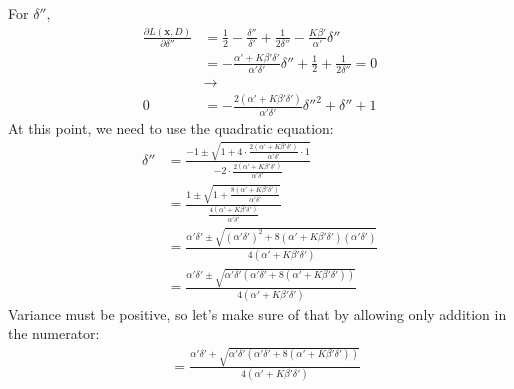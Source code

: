 \documentclass[12pt]{article}
\begin{document}
\begin{appendices}
For $\delta''$,
\begin{align}
    \frac{\partial L(\bm{x}, D)}{\partial \delta''} &=
    \frac{1}{2} - \frac{\delta''}{\delta'}
    + \frac{1}{2\delta''} - \frac{K\beta'}{\alpha'}\delta''
    \nonumber \\
    &= -\frac{\alpha' + K\beta'\delta'}{\alpha'\delta'}\delta'' + \frac{1}{2}
    + \frac{1}{2\delta''} = 0
    \nonumber \\
    & \rightarrow
    \nonumber \\
    0 &= -\frac{2(\alpha' + K\beta'\delta')}{\alpha'\delta'}\delta''^2
    + \delta''
    + 1
    \nonumber
\end{align}
At this point, we need to use the quadratic equation:
\begin{align}
    \delta'' &= \frac{-1 \pm
    \sqrt{1 + 4\cdot\frac{2(\alpha' + K\beta'\delta')}{\alpha'\delta'}
    \cdot 1}}
    {-2\cdot\frac{2(\alpha' + K\beta'\delta')}{\alpha'\delta'}}
    \nonumber \\
    &= \frac{1 \pm
    \sqrt{1 + \frac{8(\alpha' + K\beta'\delta')}{\alpha'\delta'}}}
    {\frac{4(\alpha' + K\beta'\delta')}{\alpha'\delta'}}
    \nonumber \\
    &= \frac{\alpha'\delta' \pm
    \sqrt{(\alpha'\delta')^2 + 8(\alpha' + K\beta'\delta')(\alpha'\delta')}}
    {4(\alpha' + K\beta'\delta')}
    \nonumber \\
    &= \frac{\alpha'\delta' \pm
    \sqrt{\alpha'\delta'(\alpha'\delta' + 8(\alpha' + K\beta'\delta'))}}
    {4(\alpha' + K\beta'\delta')}
    \nonumber
\end{align}
Variance must be positive, so let's make sure of that by allowing only addition
in the numerator:
\begin{align}
    &= \frac{\alpha'\delta' +
    \sqrt{\alpha'\delta'(\alpha'\delta' + 8(\alpha' + K\beta'\delta'))}}
    {4(\alpha' + K\beta'\delta')}
\end{align}


\end{appendices}
\end{document}
